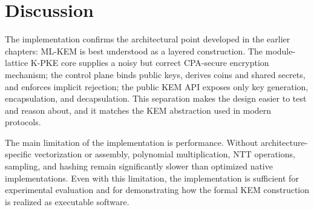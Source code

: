 \section{Discussion}

The implementation confirms the architectural point developed in the earlier chapters: ML-KEM is best understood as a layered construction. The module-lattice K-PKE core supplies a noisy but correct CPA-secure encryption mechanism; the control plane binds public keys, derives coins and shared secrets, and enforces implicit rejection; the public KEM API exposes only key generation, encapsulation, and decapsulation. This separation makes the design easier to test and reason about, and it matches the KEM abstraction used in modern protocols.

The main limitation of the implementation is performance. Without architecture-specific vectorization or assembly, polynomial multiplication, NTT operations, sampling, and hashing remain significantly slower than optimized native implementations. Even with this limitation, the implementation is sufficient for experimental evaluation and for demonstrating how the formal KEM construction is realized as executable software.
